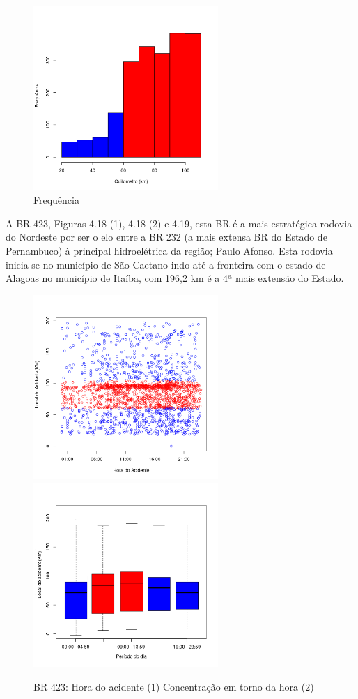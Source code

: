 \quad \quad
\begin{figure}[h]
	\centering
	\caption{ Frequência}
	\includegraphics[width=7cm,height=7cm]{Figuras/Preprocess/br408_3.png}
\end{figure}


\pagebreak

A BR 423, Figuras 4.18 (1), 4.18 (2) e 4.19, esta BR é a mais estratégica rodovia do Nordeste por ser o elo entre a BR 232 (a mais extensa BR do Estado de Pernambuco) à principal hidroelétrica da região; Paulo Afonso. Esta rodovia inicia-se no município de São Caetano indo até a fronteira com o estado de Alagoas no município de Itaíba, com 196,2 km é a 4ª mais extensão do Estado.

\begin{figure}[h]
	\caption{BR 423: Hora do acidente (1)  Concentração em torno da hora (2)}
	\includegraphics[width=7cm,height=7cm]{Figuras/Preprocess/br423_1.png}
	\includegraphics[width=7cm,height=7cm]{Figuras/Preprocess/br423_2.png}
	
\end{figure}

